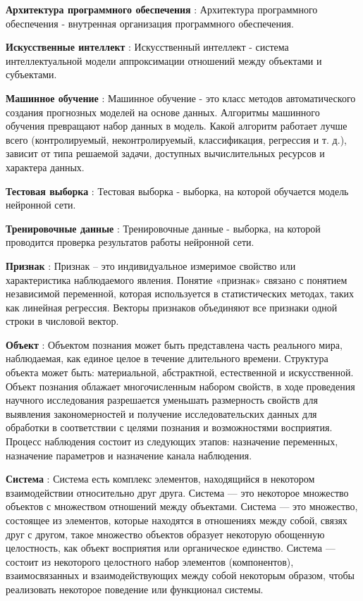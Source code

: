 \textbf{Архитектура программного обеспечения} :  Архитектура программного обеспечения - внутренная организация программного обеспечения.

\textbf{Искусственные интеллект} :  Искусственный интеллект - система интеллектуальной модели аппроксимации отношений между объектами и субъектами.

\textbf{Машинное обучение} :  Машинное обучение - это класс методов автоматического создания прогнозных моделей на основе данных. Алгоритмы машинного обучения превращают набор данных в модель. Какой алгоритм работает лучше всего (контролируемый, неконтролируемый, классификация, регрессия и т. д.), зависит от типа решаемой задачи, доступных вычислительных ресурсов и характера данных.

\textbf{Тестовая выборка} :  Тестовая выборка - выборка, на которой обучается модель нейронной сети.

\textbf{Тренировочные данные} :  Тренировочные данные - выборка, на которой проводится проверка результатов работы нейронной сети.

\textbf{Признак} :  Признак – это индивидуальное измеримое свойство или характеристика наблюдаемого явления. Понятие «признак» связано с понятием независимой переменной, которая используется в статистических методах, таких как линейная регрессия. Векторы признаков объединяют все признаки одной строки в числовой вектор.

\textbf{Объект} :  Объектом познания может быть представлена часть реального мира, наблюдаемая, как единое целое в течение длительного времени. Структура объекта может быть: материальной, абстрактной, естественной и искусственной. Объект познания облажает многочисленным набором свойств, в ходе проведения научного исследования разрешается уменьшать размерность свойств для выявления закономерностей и получение исследовательских данных для обработки в соответствии с целями познания и возможностями восприятия. Процесс наблюдения состоит из следующих этапов: назначение переменных, назначение параметров и назначение канала наблюдения.

\textbf{Система } :  Система есть комплекс элементов, находящийся в некотором взаимодействии относительно друг друга. Система — это некоторое множество объектов с множеством отношений между объектами.
Система — это множество, состоящее из элементов, которые находятся в отношениях между собой, связях друг с другом, такое множество объектов образует некоторую обощенную целостность, как объект восприятия или органическое единство. Система — состоит из некоторого целостного набор элементов (компонентов), взаимосвязанных и взаимодействующих между собой некоторым образом, чтобы реализовать некоторое поведение или функционал системы.

